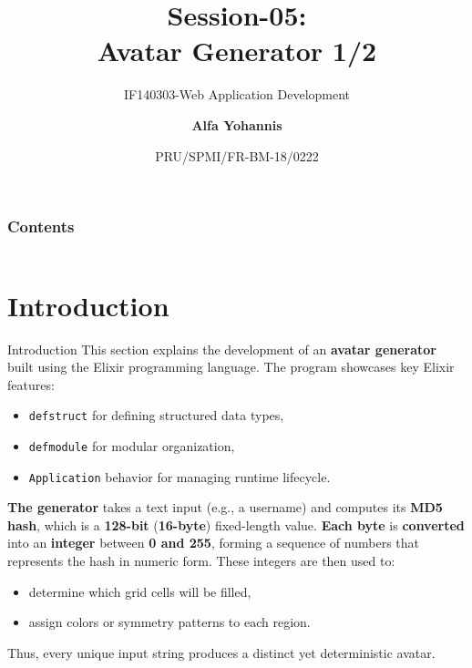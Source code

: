\documentclass[aspectratio=169, table]{beamer}
\subtitle{IF140303-Web Application Development}
\title{Session-05:\\
\Huge{
Avatar Generator 1/2\\
\vspace{5pt}
}
}
\date[Serial]{\scriptsize{PRU/SPMI/FR-BM-18/0222}}
\author[Pradita]{\small{\textbf{Alfa Yohannis}}}
\begin{document}
	
	\frame{\titlepage}
	
		\begin{frame}[fragile]
		\frametitle{Contents}
		\vspace{20pt}
		\begin{columns}[t]
			\tableofcontents[sections={1-8}]
			
			\tableofcontents[sections={9-99}]
		\end{columns}
	\end{frame}


\section{Introduction}

\begin{frame}[fragile]{Introduction}
\vspace{20pt}
This section explains the development of an \textbf{avatar generator} built using the Elixir programming language.  
The program showcases key Elixir features:
\begin{itemize}
  \item \texttt{defstruct} for defining structured data types,
  \item \texttt{defmodule} for modular organization,
  \item \texttt{Application} behavior for managing runtime lifecycle.
\end{itemize}

\textbf{The generator} takes a text input (e.g., a username) and computes its \textbf{MD5 hash}, which is a \textbf{128-bit} (\textbf{16-byte}) fixed-length value.  
\textbf{Each byte} is \textbf{converted} into an \textbf{integer }between \textbf{0 and 255}, forming a sequence of numbers that represents the hash in numeric form.  
These integers are then used to:
\begin{itemize}
  \item determine which grid cells will be filled,
  \item assign colors or symmetry patterns to each region.
\end{itemize}
Thus, every unique input string produces a distinct yet deterministic avatar.
\end{frame}
\end{document}
